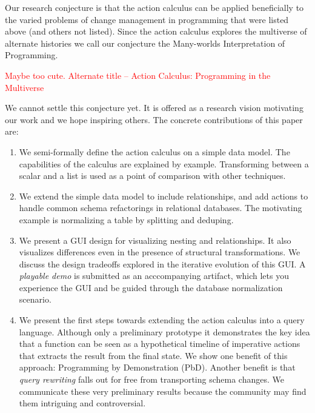 \documentclass[english,submission]{programming}
\begin{document}
Our research conjecture is that the action calculus can be applied beneficially to the varied problems of change management in programming that were listed above (and others not listed). Since the action calculus explores the multiverse of alternate histories we call our conjecture the Many-worlds Interpretation of Programming.

\textcolor{red}{Maybe too cute. Alternate title --
Action Calculus: Programming in the Multiverse\\
}

We cannot settle this conjecture yet. It is offered as a research vision motivating our work and we hope inspiring others. The concrete contributions of this paper are:

\begin{enumerate}

  \item We semi-formally define the action calculus on a simple data model. The capabilities of the calculus are explained by example. Transforming between a scalar and a list is used as a point of comparison with other techniques.

  \item We extend the simple data model to include relationships, and add actions to handle common schema refactorings in relational databases. The motivating example is normalizing a table by splitting and deduping.

  \item We present a GUI design for visualizing nesting and relationships. It also visualizes differences even in the presence of structural transformations. We discuss the design tradeoffs explored in the iterative evolution of this GUI. A \textit{playable demo} is submitted as an acccompanying artifact, which lets you experience the GUI and be guided through the database normalization scenario.

  \item We present the first steps towards extending the action calculus into a query language. Although only a preliminary prototype it demonstrates the key idea that a function can be seen as a hypothetical timeline of imperative actions that extracts the result from the final state. We show one benefit of this approach: Programming by Demonstration (PbD). Another benefit is that \textit{query rewriting} falls out for free from transporting schema changes. We communicate these very preliminary results because the community may find them intriguing and controversial.

\end{enumerate}
\end{document}
